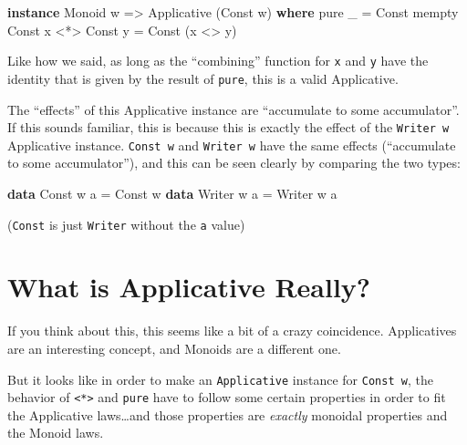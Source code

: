 \documentclass[]{article}
\newenvironment{Shaded}{}{}
\newcommand{\DataTypeTok}[1]{\textcolor[rgb]{0.56,0.13,0.00}{#1}}
\newcommand{\FunctionTok}[1]{\textcolor[rgb]{0.02,0.16,0.49}{#1}}
\newcommand{\KeywordTok}[1]{\textcolor[rgb]{0.00,0.44,0.13}{\textbf{#1}}}
\newcommand{\NormalTok}[1]{#1}
\newcommand{\OperatorTok}[1]{\textcolor[rgb]{0.40,0.40,0.40}{#1}}
\newcommand{\OtherTok}[1]{\textcolor[rgb]{0.00,0.44,0.13}{#1}}
\begin{document}
\begin{Shaded}
\begin{Highlighting}[]
\KeywordTok{instance} \DataTypeTok{Monoid}\NormalTok{ w }\OtherTok{=>} \DataTypeTok{Applicative}\NormalTok{ (}\DataTypeTok{Const}\NormalTok{ w) }\KeywordTok{where}
    \FunctionTok{pure}\NormalTok{ \_              }\OtherTok{=} \DataTypeTok{Const} \FunctionTok{mempty}
    \DataTypeTok{Const}\NormalTok{ x }\OperatorTok{<*>} \DataTypeTok{Const}\NormalTok{ y }\OtherTok{=} \DataTypeTok{Const}\NormalTok{ (x }\OperatorTok{<>}\NormalTok{ y)}
\end{Highlighting}
\end{Shaded}

Like how we said, as long as the ``combining'' function for \texttt{x} and
\texttt{y} have the identity that is given by the result of \texttt{pure}, this
is a valid Applicative.

The ``effects'' of this Applicative instance are ``accumulate to some
accumulator''. If this sounds familiar, this is because this is exactly the
effect of the \texttt{Writer\ w} Applicative instance. \texttt{Const\ w} and
\texttt{Writer\ w} have the same effects (``accumulate to some accumulator''),
and this can be seen clearly by comparing the two types:

\begin{Shaded}
\begin{Highlighting}[]
\KeywordTok{data} \DataTypeTok{Const}\NormalTok{  w a }\OtherTok{=} \DataTypeTok{Const}\NormalTok{  w}
\KeywordTok{data} \DataTypeTok{Writer}\NormalTok{ w a }\OtherTok{=} \DataTypeTok{Writer}\NormalTok{ w a}
\end{Highlighting}
\end{Shaded}

(\texttt{Const} is just \texttt{Writer} without the \texttt{a} value)

\hypertarget{what-is-applicative-really}{%
\section{What is Applicative Really?}\label{what-is-applicative-really}}

If you think about this, this seems like a bit of a crazy coincidence.
Applicatives are an interesting concept, and Monoids are a different one.

But it looks like in order to make an \texttt{Applicative} instance for
\texttt{Const\ w}, the behavior of \texttt{\textless{}*\textgreater{}} and
\texttt{pure} have to follow some certain properties in order to fit the
Applicative laws\ldots and those properties are \emph{exactly} monoidal
properties and the Monoid laws.
\end{document}
